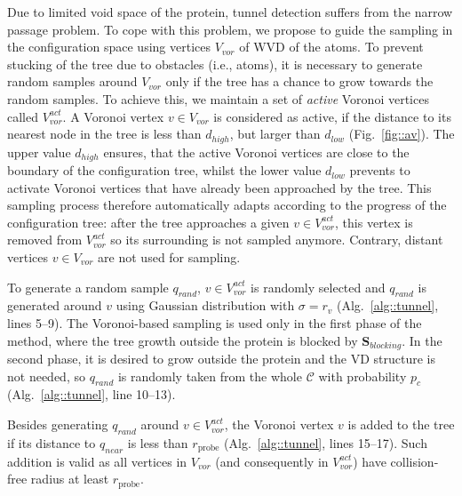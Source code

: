 \documentclass{llncs}
\def\qrand{q_{rand}}
\def\qnear{q_{near}}
\def\C{\mathcal{C}}
\def\VV{V_{vor}}
\def\VVA{V_{vor}^{act}}
\def\da{d_{high}}
\def\db{d_{low}}
\def\probe{r_{\mathrm{probe}}}
\def\SB{\mathbf{S}_{blocking}}
\def\gb{p_{c}}
\begin{document}
Due to limited void space of the protein, tunnel detection suffers from the narrow passage problem.
To cope with this problem, we propose to guide the sampling in the configuration space using vertices $\VV$ of WVD of the atoms.
To prevent stucking of the tree due to obstacles (i.e., atoms), it is necessary to generate random samples around $\VV$ only if the tree has
a chance to grow towards the random samples.
To achieve this, we maintain a set of {\sl active} Voronoi vertices called $\VVA$. 
A Voronoi vertex $v \in \VV$ is considered as active, if the distance to its nearest node in the tree is less than $\da$, but larger than
$\db$ (Fig.~\ref{fig::av}).
The upper value $\da$ ensures, that the active Voronoi vertices are close to the boundary of the configuration tree, whilst
the lower value $\db$ prevents to activate Voronoi vertices that have already been approached by the tree.
This sampling process therefore automatically adapts according to the progress of the configuration tree:
after the tree approaches a given $v \in \VVA$, this vertex is removed from $\VVA$ so its surrounding is not sampled anymore.
Contrary, distant vertices $v \in \VV$ are not used for sampling.


To generate a random sample $\qrand$, $v \in \VVA$ is randomly selected and $\qrand$ is generated around $v$ using Gaussian distribution with 
$\sigma = r_v$ (Alg.~\ref{alg::tunnel}, lines 5--9).
The Voronoi-based sampling is used only in the first phase of the method, where the tree growth outside the protein is blocked by $\SB$.  
In the second phase, it is desired to grow outside the protein and the VD structure is not needed, so
 $\qrand$ is randomly taken from the whole $\C$ with probability $\gb$ (Alg.~\ref{alg::tunnel}, line 10--13).


Besides generating $\qrand$ around $v \in \VVA$, the Voronoi vertex $v$ is added to the tree if its distance to $\qnear$ is less than
 $\probe$ (Alg.~\ref{alg::tunnel}, lines 15--17).
Such addition is valid as all vertices in $\VV$ (and consequently in $\VVA$) have collision-free radius at least $\probe$.
\end{document}
